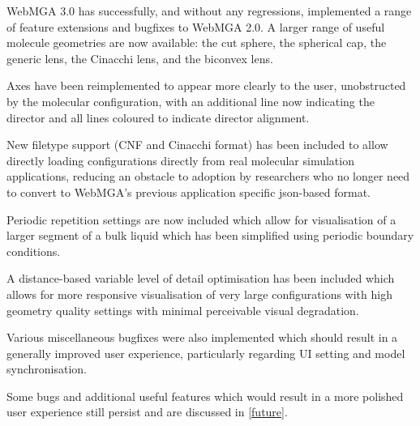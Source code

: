 WebMGA 3.0 has successfully, and without any regressions, implemented a range of feature extensions and bugfixes to WebMGA 2.0. A larger range of useful molecule geometries are now available: the cut sphere, the spherical cap, the generic lens, the Cinacchi lens, and the biconvex lens.

Axes have been reimplemented to appear more clearly to the user, unobstructed by the molecular configuration, with an additional line now indicating the director and all lines coloured to indicate director alignment. 

New filetype support (CNF and Cinacchi format) has been included to allow directly loading configurations directly from real molecular simulation applications, reducing an obstacle to adoption by researchers who no longer need to convert to WebMGA's previous application specific json-based format.

Periodic repetition settings are now included which allow for visualisation of a larger segment of a bulk liquid which has been simplified using periodic boundary conditions.

A distance-based variable level of detail optimisation has been included which allows for more responsive visualisation of very large configurations with high geometry quality settings with minimal perceivable visual degradation.

Various miscellaneous bugfixes were also implemented which should result in a generally improved user experience, particularly regarding UI setting and model synchronisation.

Some bugs and additional useful features which would result in a more polished user experience still persist and are discussed in \cref{future}.
